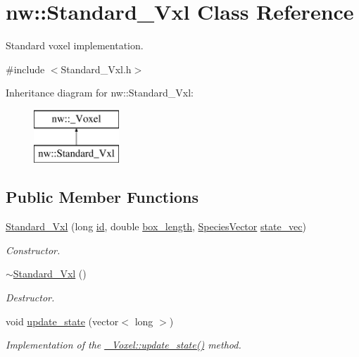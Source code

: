 \hypertarget{classnw_1_1_standard___vxl}{\section{nw\+:\+:Standard\+\_\+\+Vxl Class Reference}
\label{classnw_1_1_standard___vxl}
}


Standard voxel implementation.  




{\ttfamily \#include $<$Standard\+\_\+\+Vxl.\+h$>$}

Inheritance diagram for nw\+:\+:Standard\+\_\+\+Vxl\+:\begin{figure}[H]
\begin{center}
\leavevmode
\includegraphics[height=2.000000cm]{d6/de9/classnw_1_1_standard___vxl}
\end{center}
\end{figure}
\subsection*{Public Member Functions}
\begin{DoxyCompactItemize}
\item 
\hyperlink{classnw_1_1_standard___vxl_ad1d02439e7f0cc07201670e1ea71948f}{Standard\+\_\+\+Vxl} (long \hyperlink{classnw_1_1___voxel_a01b73aff9af26230df4c483c5bd81896}{id}, double \hyperlink{classnw_1_1___voxel_ad9c3dbd0ea989af6ba7e1b5e09f6a989}{box\+\_\+length}, \hyperlink{namespacenw_a68aa8285591d78ebfc793c531bd43a23}{Species\+Vector} \hyperlink{classnw_1_1___voxel_a7762f59802c2a0b54bd18acbf803ff34}{state\+\_\+vec})
\begin{DoxyCompactList}\small\item\em Constructor. \end{DoxyCompactList}\item 
\hyperlink{classnw_1_1_standard___vxl_aec0005a231762580af391251e9308c2c}{$\sim$\+Standard\+\_\+\+Vxl} ()
\begin{DoxyCompactList}\small\item\em Destructor. \end{DoxyCompactList}\item 
void \hyperlink{classnw_1_1_standard___vxl_a1d8906f5bbbce6315585959bd1b1a935}{update\+\_\+state} (vector$<$ long $>$)
\begin{DoxyCompactList}\small\item\em Implementation of the \hyperlink{classnw_1_1___voxel_a5842ac3c24bda907204852db0cf46810}{\+\_\+\+Voxel\+::update\+\_\+state()} method. \end{DoxyCompactList}\end{DoxyCompactItemize}
